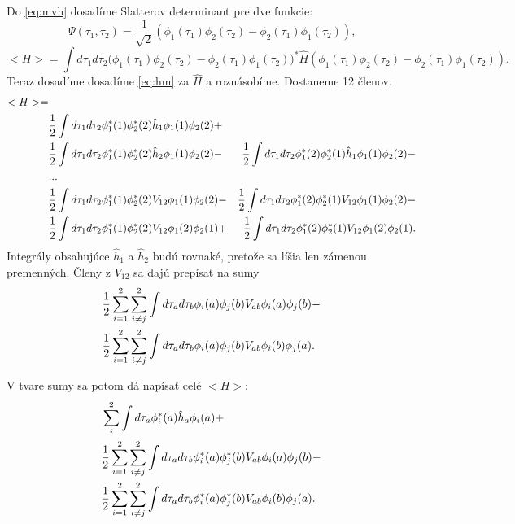 Do \eqref{eq:mvh} dosadíme Slatterov determinant pre dve funkcie:
\begin{equation}
 \label{eq:Psi2}
 \Psi(\tau_1,\tau_2)=\frac{1}{\sqrt{2}}({\phi_1(\tau_1)\phi_2(\tau_2)-\phi_2(\tau_1)\phi_1(\tau_2)}) \text{,}
\end{equation}
\begin{equation}
 \label{eq:mvh2}
 <H>=\int{d\tau_1d\tau_2\bigl( \phi_1(\tau_1)\phi_2(\tau_2)-\phi_2(\tau_1)\phi_1(\tau_2)\bigr)^*\hat H(\phi_1(\tau_1)\phi_2(\tau_2)-\phi_2(\tau_1)\phi_1(\tau_2))} \text{.}
\end{equation}
Teraz dosadíme dosadíme \eqref{eq:hm} za $\hat H$ a roznásobíme. Dostaneme 12 členov.
\begin{align}
<H>=&\\ \notag
 &\frac{1}{2}\int{d\tau_1 d\tau_2 \phi^*_1(1)\phi^*_2(2)\hat h_1\phi_1(1)\phi_2(2)}+\\ \notag
 &\frac{1}{2}\int{d\tau_1 d\tau_2 \phi^*_1(1)\phi^*_2(2)\hat h_2\phi_1(1)\phi_2(2)}- \notag
 &\frac{1}{2}\int{d\tau_1 d\tau_2 \phi^*_1(2)\phi^*_2(1)\hat h_1\phi_1(1)\phi_2(2)}-\\ \notag
 &...\\ \notag
  &\frac{1}{2}\int{d\tau_1 d\tau_2 \phi^*_1(1)\phi^*_2(2)V_{12}\phi_1(1)\phi_2(2)}- \notag
  &\frac{1}{2}\int{d\tau_1 d\tau_2 \phi^*_1(2)\phi^*_2(1)V_{12}\phi_1(1)\phi_2(2)}-\\ \notag
  &\frac{1}{2}\int{d\tau_1 d\tau_2 \phi^*_1(1)\phi^*_2(2)V_{12}\phi_1(2)\phi_2(1)}+ \notag
   &\frac{1}{2}\int{d\tau_1 d\tau_2 \phi^*_1(2)\phi^*_2(1)V_{12}\phi_1(2)\phi_2(1)} \notag \text{.}
\end{align}
Integrály obsahujúce $\hat h_1$ a $\hat h_2$ budú rovnaké, pretože sa líšia len zámenou premenných. Členy z $V_{12}$ sa dajú prepísať na sumy
\begin{align}
 \label{eq:sumij}
 &\frac{1}{2} \sum_{i=1}^2{\sum_{i\neq j}^2 \int d\tau_a d\tau_b\phi_i(a)\phi_j(b)V_{ab}\phi_i(a)\phi_j(b)}-\\
 &\frac{1}{2} \sum_{i=1}^2{\sum_{i\neq j}^2 \int d\tau_a d\tau_b\phi_i(a)\phi_j(b)V_{ab}\phi_i(b)\phi_j(a)} \notag \text{.}
\end{align}

V tvare sumy sa potom dá napísať celé $<H>$:
\begin{align}
  \label{eq:hsum}
 &\sum_i^2 \int d\tau_a \phi^*_i(a)\hat h_a \phi_i(a) +\\
 &\frac{1}{2} \sum_{i=1}^2{\sum_{i\neq j}^2 \int d\tau_a d\tau_b\phi_i^*(a)\phi_j^*(b)V_{ab}\phi_i(a)\phi_j(b)}- \notag \\
 &\frac{1}{2} \sum_{i=1}^2{\sum_{i\neq j}^2 \int d\tau_a d\tau_b\phi_i^*(a)\phi_j^*(b)V_{ab}\phi_i(b)\phi_j(a)} \notag \text{.}
\end{align}

